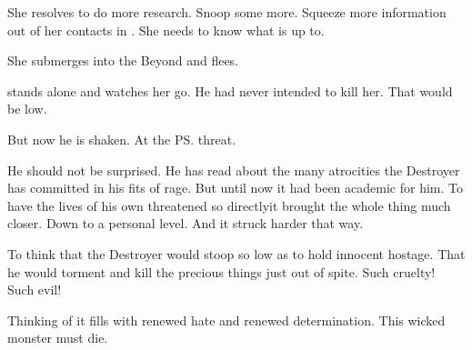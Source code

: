 She resolves to do more research. 
Snoop some more. 
Squeeze more information out of her contacts in \Nyx. 
She needs to know what \Teshrial is up to. 

She submerges into the Beyond and flees. 





\begin{comment}
  \section{\Teshrial thinks}
\end{comment}
\Teshrial stands alone and watches her go. 
He had never intended to kill her. 
That would be low. 

But now he is shaken. 
At the \ps{\scatha} threat. 

He should not be surprised. 
He has read about the many atrocities the Destroyer has committed in his fits of rage. 
But until now it had been academic for him. 
To have the lives of his own \humans threatened so directly\prikker it brought the whole thing much closer. 
Down to a personal level. 
And it struck harder that way. 

To think that the Destroyer would stoop so low as to hold innocent \humans hostage. 
That he would torment and kill the precious things just out of spite. 
Such cruelty!
Such evil! 

Thinking of it fills \Teshrial with renewed hate and renewed determination. 
This wicked monster must die. 







